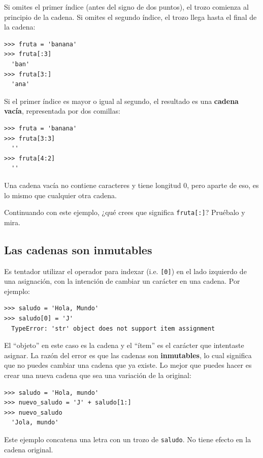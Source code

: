 Si omites el primer índice (antes del signo de dos puntos), el trozo comienza al
principio de la cadena.  Si omites el segundo índice, el trozo
llega hasta el final de la cadena:

\begin{Verbatim}[frame=single]
>>> fruta = 'banana'
>>> fruta[:3]
  'ban'
>>> fruta[3:]
  'ana'
\end{Verbatim}
%
Si el primer índice es mayor o igual al segundo, el resultado
es una \textbf{cadena vacía}, representada por dos comillas:

\begin{Verbatim}[frame=single]
>>> fruta = 'banana'
>>> fruta[3:3]
  ''
>>> fruta[4:2]
  ''
\end{Verbatim}
%
Una cadena vacía no contiene caracteres y tiene longitud 0, pero aparte
de eso, es lo mismo que cualquier otra cadena.

Continuando con este ejemplo, ¿qué crees que significa
\texttt{fruta[:]}?  Pruébalo y mira.


\subsection{Las cadenas son inmutables}

Es tentador utilizar el operador para indexar (i.e. \texttt{[0]}) en el lado izquierdo de una
asignación, con la intención de cambiar un carácter en una cadena.
Por ejemplo:

\begin{Verbatim}[frame=single]
>>> saludo = 'Hola, Mundo'
>>> saludo[0] = 'J'
  TypeError: 'str' object does not support item assignment
\end{Verbatim}
%
El ``objeto'' en este caso es la cadena y el ``ítem'' es
el carácter que intentaste asignar.  La razón del error es que
las cadenas son \textbf{inmutables}, lo cual significa que no puedes cambiar una
cadena que ya existe.  Lo mejor que puedes hacer es crear una nueva cadena
que sea una variación de la original:

\begin{Verbatim}[frame=single]
>>> saludo = 'Hola, mundo'
>>> nuevo_saludo = 'J' + saludo[1:]
>>> nuevo_saludo
  'Jola, mundo'
\end{Verbatim}
%
Este ejemplo concatena una  letra con
un trozo de \texttt{saludo}.  No tiene efecto en
la cadena original.


